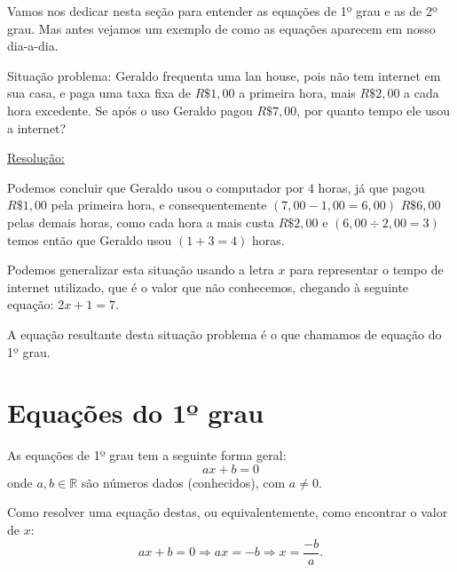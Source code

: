 Vamos nos dedicar nesta seção para entender as equações de 1º grau e as de 2º grau. Mas antes vejamos um exemplo de como as equações aparecem em nosso dia-a-dia.

\begin{exem}
 Situação problema: Geraldo frequenta uma lan house, pois não tem internet em sua casa, e paga uma taxa fixa de $R\$ 1,00$ a primeira hora, mais $R\$ 2,00$ a cada hora excedente. Se após o uso Geraldo pagou $R\$ 7,00$, por quanto tempo ele usou a internet?

 \underline{Resolução:}

 Podemos concluir que Geraldo usou o computador por $4$ horas, já que pagou $R\$ 1,00$ pela primeira hora, e consequentemente $(7,00 - 1,00 = 6,00)$ $R\$ 6,00$ pelas demais horas, como cada hora a mais custa $R\$ 2,00$ e $(6,00 \div 2,00 = 3)$ temos então que Geraldo usou $(1 + 3 = 4)$ horas.

 Podemos generalizar esta situação usando a letra $x$ para representar o tempo de internet utilizado, que é o valor que não conhecemos, chegando à seguinte equação: $2x + 1 = 7$.
\end{exem}

A equação resultante desta situação problema é o que chamamos de equação do 1º grau.

\section{Equações do 1º grau}

\colorbox{azul}{
 \begin{minipage}{0.9\linewidth}
 \begin{center}
   As equações de 1º grau tem a seguinte forma geral:
\begin{equation}
ax + b = 0
\end{equation}
onde $a, b \in \mathbb{R}$ são números dados (conhecidos), com $a \neq 0 $.
 \end{center}
 \end{minipage}}

 \vskip0.3cm

Como resolver uma equação destas, ou equivalentemente, como encontrar o valor de $x$:
\begin{equation}
ax + b = 0 \Rightarrow ax= -b \Rightarrow x = \frac{-b}{a} .
\end{equation}



